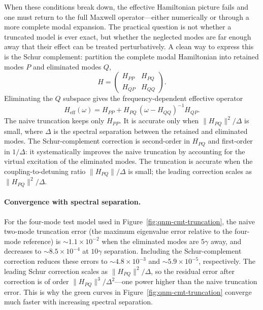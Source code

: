 When these conditions break down, the effective Hamiltonian picture fails
and one must return to the full Maxwell operator---either numerically or
through a more complete modal expansion. The practical question is not
whether a truncated model is ever exact, but whether the neglected modes
are far enough away that their effect can be treated perturbatively. A
clean way to express this is the Schur complement: partition the complete
modal Hamiltonian into retained modes $P$ and eliminated modes $Q$,
\begin{equation}
 H = \begin{pmatrix} H_{PP} & H_{PQ} \\
 H_{QP} & H_{QQ} \end{pmatrix}.
 \label{eq:schur-partition}
\end{equation}
Eliminating the $Q$ subspace gives the frequency-dependent effective
operator
\begin{equation}
 H_{\mathrm{eff}}(\omega)
 = H_{PP} + H_{PQ}\,(\omega - H_{QQ})^{-1}H_{QP}.
 \label{eq:schur-heff}
\end{equation}
The naive truncation keeps only $H_{PP}$. It is accurate only when
$\|H_{PQ}\|^2/\Delta$ is small, where $\Delta$ is the spectral separation
between the retained and eliminated modes. The Schur-complement
correction is second-order in $H_{PQ}$ and first-order in $1/\Delta$:
it systematically improves the naive truncation by accounting for the
virtual excitation of the eliminated modes.  The truncation is accurate
when the coupling-to-detuning ratio $\|H_{PQ}\|/\Delta$ is small;
the leading correction scales as $\|H_{PQ}\|^2/\Delta$.

\paragraph{Convergence with spectral separation.}
For the four-mode test model used in Figure~\ref{fig:qnm-cmt-truncation},
the naive two-mode truncation error (the maximum eigenvalue error
relative to the four-mode reference) is $\sim 1.1 \times 10^{-2}$ when
the eliminated modes are $5\gamma$ away, and decreases to
$\sim 8.5 \times 10^{-4}$ at $10\gamma$ separation. Including the
Schur-complement correction reduces these errors to
$\sim 4.8 \times 10^{-3}$ and $\sim 5.9 \times 10^{-5}$, respectively.
The leading Schur correction scales as $\|H_{PQ}\|^2/\Delta$,
so the residual error after correction is of order
$\|H_{PQ}\|^3/\Delta^2$---one power higher than the naive
truncation error.  This is why the green curves in
Figure~\ref{fig:qnm-cmt-truncation} converge much faster with
increasing spectral separation.

